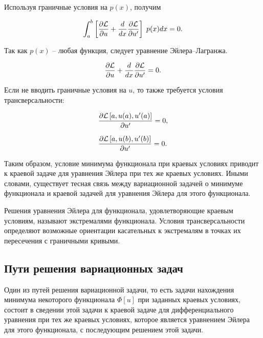 \documentclass{article}
\begin{document}
\noindent Используя граничные условия на $p(x)$, получим

\begin{displaymath}
	\int_{a}^{b} \left[\frac{\partial \mathcal{L}}{\partial u} + \frac{d}{dx} \frac{\partial \mathcal{L}}{\partial u'} \right]  \; p(x) dx = 0.
\end{displaymath}

\noindent Так как $p(x)$ -- любая функция, следует уравнение Эйлера--Лагранжа.

\begin{equation}\label{euler_equation}
	\frac{\partial \mathcal{L}}{\partial u} + \frac{d}{dx} \frac{\partial \mathcal{L}}{\partial u'} = 0.
\end{equation}

\noindent Если не вводить граничные условия на $u$, то также требуется условия трансверсальности:

\begin{displaymath}
	\frac{\partial \mathcal{L} \left[a, u(a), u'(a) \right] }{\partial u'} = 0,
\end{displaymath}

\begin{displaymath}
	\frac{\partial \mathcal{L} \left[a, u(b), u'(b) \right] }{\partial u'} = 0.
\end{displaymath}


Таким образом, условие минимума функционала при краевых условиях приводит к краевой задаче для уравнения Эйлера при тех же краевых условиях.
Иными словами, существует тесная связь между вариационной задачей о минимуме функционала и краевой задачей для уравнения Эйлера для этого функционала.

\begin{warn}[Важно!]
	Решения уравнения Эйлера для функционала, удовлетворяющие краевым условиям, называют экстремалями функционала.
	Условия трансверсальности определяют возможные ориентации касательных к экстремалям в точках их пересечения с граничными кривыми.
\end{warn}


\subsection{Пути решения вариационных задач}

Один из путей решения вариационной задачи, то есть задачи нахождения минимума некоторого функционала $\Phi[u]$ при заданных краевых условиях, 
состоит в сведении этой задачи к краевой задаче для дифференциального уравнения при тех же краевых условиях, 
которое является уравнением Эйлера для этого функционала, с последующим решением этой задачи.
\end{document}
